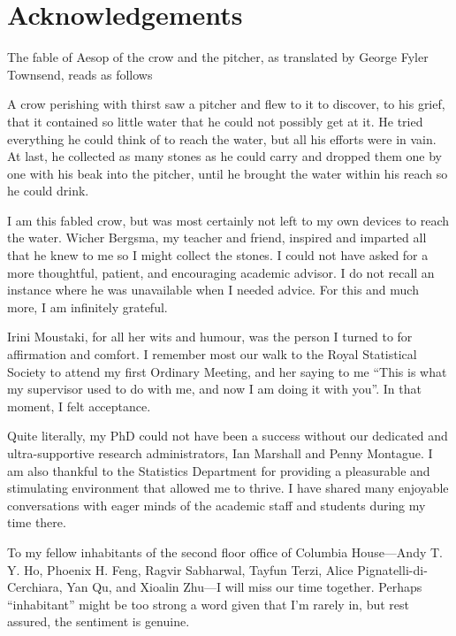 \documentclass[11pt,twoside,openright,showframe]{report}
\begin{document}
\chapter*{Acknowledgements} 

The fable of Aesop of the crow and the pitcher, as translated by George Fyler Townsend, reads as follows 

\begingroup
\singlespacing
\begin{displayquote}
A crow perishing with thirst saw a pitcher and flew to it to discover, to his grief, that it contained so little water that he could not possibly get at it. 
He tried everything he could think of to reach the water, but all his efforts were in vain. 
At last, he collected as many stones as he could carry and dropped them one by one with his beak into the pitcher, until he brought the water within his reach so he could drink.
\end{displayquote}
\endgroup

I am this fabled crow, but was most certainly not left to my own devices to reach the water.
Wicher Bergsma, my teacher and friend, inspired and imparted all that he knew to me so I might collect the stones.
I could not have asked for a more thoughtful, patient, and encouraging academic advisor.
I do not recall an instance where he was unavailable when I needed  advice.
For this and much more, I am infinitely grateful.

Irini Moustaki, for all her wits and humour, was the person I turned to for affirmation and comfort. 
I remember most our walk to the Royal Statistical Society to attend my first Ordinary Meeting, and her saying to me ``This is what my supervisor used to do with me, and now I am doing it with you''. 
In that moment, I felt acceptance.

Quite literally, my PhD could not have been a success without our dedicated and ultra-supportive research administrators, Ian Marshall and Penny Montague.
I am also thankful to the Statistics Department for providing a pleasurable and stimulating environment that allowed me to thrive.
I have shared many enjoyable conversations with eager minds of the academic staff and students during my time there.

To my fellow inhabitants of the second floor office of Columbia House---Andy T. Y. Ho, Phoenix H. Feng, Ragvir Sabharwal, Tayfun Terzi, Alice Pignatelli-di-Cerchiara, Yan Qu, and Xioalin Zhu---I will miss our time together.
Perhaps ``inhabitant'' might be too strong a word given that I'm rarely in, but rest assured, the sentiment is genuine.
\end{document}
